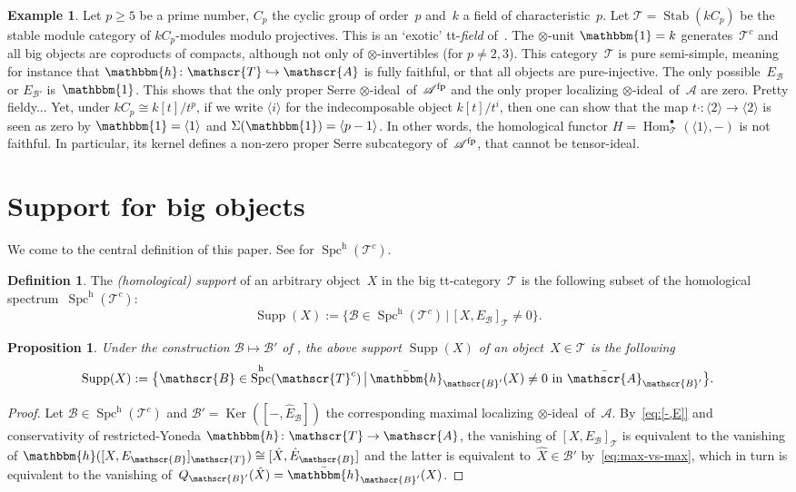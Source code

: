 \documentclass[JEP,XML,SOM,Unicode]{cedram}
\def\hto{\mathrel{\lhook\joinrel\to}}
\numberwithin{equation}{section}
\newtheorem{Prop}[equation]{Proposition}
\theoremstyle{definition}
\newtheorem{Def}[equation]{Definition}
\newtheorem{Exa}[equation]{Example}
\DeclareMathOperator{\Hom}{Hom}
\DeclareMathOperator{\Ker}{Ker}
\DeclareMathOperator{\Spc}{Spc}
\newcommand{\cat}[1]{\mathscr{#1}}
\newcommand{\Homcat}[1]{\Hom_{\cat #1}}
\newcommand{\SET}[2]{\big\{#1\,\big|\,#2\big\}}
\newcommand{\unit}{\mathbbm{1}}
\newcommand{\smallh}{\mathrm{h}}
\DeclareMathOperator{\Stab}{Stab}
\DeclareMathOperator{\Supp}{Supp}
\newcommand{\ABp}{\bar{\cA}_{\cB'}}
\newcommand{\boneda}{\bar\yoneda}
\newcommand{\cA}{\cat{A}}
\newcommand{\cB}{\cat{B}}
\newcommand{\cT}{\cat{T}}
\newcommand{\EBp}{E_{\cB'}}
\newcommand{\EB}{E_{\cB}}
\newcommand{\fp}{^{\textup{fp}}}
\newcommand{\hBp}{\boneda_{\cB'}}
\newcommand{\hEB}{\hat E_{\cB}}
\let\hook\hto
\newcommand{\sbull}{{\scriptscriptstyle\bullet}}
\newcommand{\SpchT}{\Spch(\cat{T}^c)}
\newcommand{\Spch}{\Spc^{\smallh}}
\newcommand{\tensid}{$\otimes$\nobreakdash-ideal}
\newcommand{\yoneda}{\mathbbm{h}}
\begin{document}
\begin{Exa}
Let $p\ge 5$ be a prime number, $C_p$ the cyclic group of order~$p$ and~$k$ a field of characteristic~$p$. Let $\cT=\Stab(kC_p)$ be the stable module category of $kC_p$-modules modulo projectives. This is an `exotic' tt-\emph{field} of~\cite{BalmerKrauseStevenson19}. The $\otimes$-unit $\unit=k$ generates~$\cT^c$ and all big objects are coproducts of compacts, although not only of $\otimes$-invertibles (for $p\neq 2,3$). This category~$\cT$ is pure semi-simple, meaning for instance that $\yoneda\colon \cT\hook\cA$ is fully faithful, or that all objects are pure-injective. The only possible~$\EB$ or $\EBp$ is~$\unit$. This shows that the only proper Serre \tensid\ of~$\cA\fp$ and the only proper localizing \tensid\ of~$\cA$ are zero. Pretty fieldy... Yet, under $kC_p\cong k[t]/t^p$, if we write $\langle i\rangle$ for the indecomposable object $k[t]/t^i$, then one can show that the map $t\cdot\colon\langle2\rangle\to \langle2\rangle$ is seen as zero by $\unit=\langle1\rangle$ and $\Sigma(\unit)=\langle p-1\rangle$. In other words, the homological functor $H=\Homcat{\cT}^\sbull(\langle1\rangle,-)$ is not faithful. In particular, its kernel defines a non-zero proper Serre subcategory of~$\cA\fp$, that cannot be tensor-ideal.
\end{Exa}

\section{Support for big objects}
\label{sec:support}

We come to the central definition of this paper. See  for $\SpchT$.

\begin{Def}
\label{Def:Supp}
The \emph{(homological) support} of an arbitrary object~$X$ in the big tt-category~$\cat{T}$ is the following subset of the homological spectrum~$\SpchT$:
\[
\Supp(X):=\SET{\cB\in\SpchT}{[X,\EB]_{\cT}\neq 0}.
\]
\end{Def}

\begin{Prop}
\label{Prop:Supp}
Under the construction $\cB\mapsto \cB'$ of , the above support $\Supp(X)$ of an object~$X\in\cT$ is the following
\[
\Supp(X):=\SET{\cB\in\SpchT}{\hBp(X)\neq 0\text{ in }\ABp}.
\]
\end{Prop}

\begin{proof}
Let $\cB\in\SpchT$ and $\cB'=\Ker([-,\hEB])$ the corresponding maximal localizing \tensid\ of~$\cA$. By~\eqref{eq:[-,E]} and conservativity of restricted-Yoneda $\yoneda\colon \cT\to \cA$, the vanishing of $[X,\EB]_\cT$ is equivalent to the vanishing of $\yoneda([X,\EB]_\cT)\cong [\hat X,\hEB]$ and the latter is equivalent to~$\hat X\in{\cB'}$ by~\eqref{eq:max-vs-max}, which in turn is equivalent to the vanishing of~$Q_{\cB'}(\hat X)=\hBp(X)$.
\end{proof}
\end{document}
